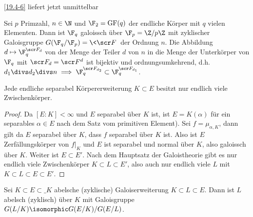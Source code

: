 \ref{19.4-6} liefert jetzt unmittelbar

\begin{st} \label{19.5-2}
	Sei $p$ Primzahl, $n \in \N$ und $\F_2 = \GF(q)$ der endliche Körper mit $q$ vielen Elementen.
	Dann ist $\F_q$ galoissch über $\F_p = \Z / p\Z$ mit zyklischer Galoisgruppe $G(\F_q / \F_p) = \<\scr F\>$ der Ordnung $n$.
	Die Abbildung $d \mapsto \F_q^{\scr F_d}$ von der Menge der Teiler $d$ von $n$ in die Menge der Unterkörper von $\F_q$ mit $\scr F_d = \scr F^d$ ist bijektiv und ordnungsumkehrend, d.h. $d_1 \divs d_2 \divs n \implies \F_q^{\scr F_{d_2}} \subset \F_q^{\scr F_{d_1}}$.
\end{st}

\begin{st} \label{19.5-3}
	Jede endliche separabel Körpererweiterung $K \subset E$ besitzt nur endlich viele Zwischenkörper.
	\begin{proof}
		Da $[E : K] < \infty$ und $E$ separabel über $K$ ist, ist $E = K(\alpha)$ für ein separables $\alpha \in E$ nach dem Satz vom primitiven Element).
		Sei $f = \mu_{\alpha, K}$, dann gilt da $E$ separabel über $K$, dass $f$ separabel über $K$ ist.
		Also ist $E$ Zerfällungskörper von $f|_K$ und $E$ ist separabel und normal über $K$, also galoissch über $K$.
		Weiter ist $E \subset E'$.
		Nach dem Hauptsatz der Galoistheorie gibt es nur endlich viele Zwischenkörper $K \subset L \subset E'$, also auch nur endlich viele $L$ mit $K \subset L \subset E \subset E'$.
	\end{proof}
\end{st}

\begin{st} \label{19.5-4}
	Sei $K \subset E \subset \_K$ abelsche (zyklische) Galoiserweiterung $K \subset L \subset E$.
	Dann ist $L$ abelsch (zyklisch) über $K$ mit Galoisgruppe $G(L/K) \isomorphic G(E/K) / G(E/L)$.
\end{st}


